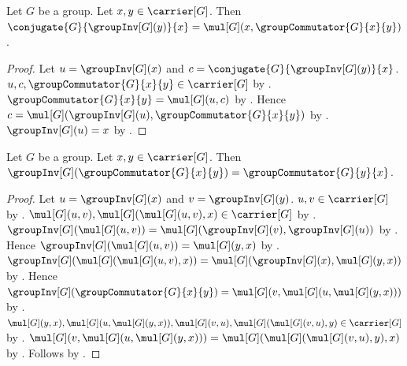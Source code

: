 \begin{corollary}\label{group_conjugate_inverse_eq_mul_commutator}
    Let $G$ be a group.
    Let $x,y\in\carrier[G]$.
    Then
        $\conjugate{G}{\groupInv[G](y)}{x}=
            \mul[G](x,\groupCommutator{G}{x}{y})$.
\end{corollary}
\begin{proof}
    Let $u=\groupInv[G](x)$ and
        $c=\conjugate{G}{\groupInv[G](y)}{x}$.
    $u,c,\groupCommutator{G}{x}{y}\in\carrier[G]$ by
        .
    $\groupCommutator{G}{x}{y}=\mul[G](u,c)$ by
        .
    Hence
        $c=\mul[G](\groupInv[G](u),
            \groupCommutator{G}{x}{y})$ by
        .
    $\groupInv[G](u)=x$ by
        .
\end{proof}

\begin{theorem}\label{group_commutator_inverse}
    Let $G$ be a group.
    Let $x,y\in\carrier[G]$.
    Then
        $\groupInv[G](\groupCommutator{G}{x}{y})=
            \groupCommutator{G}{y}{x}$.
\end{theorem}
\begin{proof}
    Let $u=\groupInv[G](x)$ and $v=\groupInv[G](y)$.
    $u,v\in\carrier[G]$ by .
    $\mul[G](u,v),\mul[G](\mul[G](u,v),x)\in\carrier[G]$ by
        .
    $\groupInv[G](\mul[G](u,v))=
        \mul[G](\groupInv[G](v),\groupInv[G](u))$ by
        .
    Hence $\groupInv[G](\mul[G](u,v))=\mul[G](y,x)$ by
        .
    $\groupInv[G](\mul[G](\mul[G](u,v),x))=
        \mul[G](\groupInv[G](x),\mul[G](y,x))$ by
        .
    Hence
        $\groupInv[G](\groupCommutator{G}{x}{y})=
            \mul[G](v,
                \mul[G](u,\mul[G](y,x)))$ by
        .
    $\mul[G](y,x),\mul[G](u,\mul[G](y,x)),
        \mul[G](v,u),\mul[G](\mul[G](v,u),y)\in\carrier[G]$ by
        .
    $\mul[G](v,\mul[G](u,\mul[G](y,x)))=
        \mul[G](\mul[G](\mul[G](v,u),y),x)$ by
        .
    Follows by .
\end{proof}

